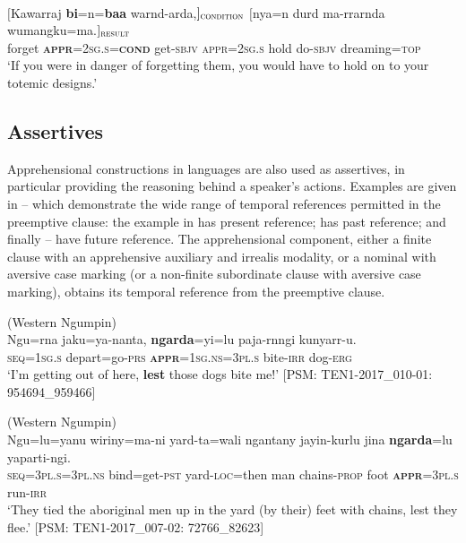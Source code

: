 \documentclass[output=paper,colorlinks,citecolor=brown]{langscibook}
\begin{document}
\ea 
{} \\
\gll $[$Kawarraj \textbf{bi}=n=\textbf{baa} {warnd-arda,$]{_\textnormal{\textsc{condition}}}$ \hspace*{2cm}} $[$nya=n durd ma-rrarnda wumangku=ma.$]{_\textnormal{\textsc{result}}}$ \\
forget \textsc{\textbf{appr}=2sg.s=\textbf{cond}} get-\textsc{sbjv} \textsc{appr=2sg.s} hold do-\textsc{sbjv} dreaming=\textsc{top} \\
\glt `If you were in danger of forgetting them, you would have to hold on to your totemic designs.'
\label{ex:bro81}
\z

\subsection{Assertives}
\label{subsec:assertives}
\largerpage

Apprehensional constructions in  languages are also used as assertives, in particular providing the reasoning behind a speaker’s actions. Examples are given in -- which demonstrate the wide range of temporal references permitted in the preemptive clause: the example in  has present reference;  has past reference; and finally -- have future reference. The apprehensional component, either a finite clause with an apprehensive auxiliary and irrealis modality, or a nominal with aversive case marking (or a non-finite subordinate clause with aversive case marking), obtains its temporal reference from the preemptive clause.

\ea
\textnormal{ (Western Ngumpin)} \\
\gll Ngu=rna jaku=ya-nanta, \textbf{ngarda}=yi=lu paja-rnngi kunyarr-u. \\
\textsc{seq=1sg.s} depart=go\textsc{-prs} \textsc{\textbf{appr}=1sg.ns=3pl.s} bite-\textsc{irr} dog-\textsc{erg} \\
\glt `I'm getting out of here, \textbf{lest} those dogs bite me!' [PSM: TEN1-2017\_010-01: 954694\_959466]
\label{ex:bro82}
\z

\ea 
\textnormal{ (Western Ngumpin)} \\
\gll Ngu=lu=yanu wiriny=ma-ni yard-ta=wali ngantany jayin-kurlu jina \textbf{ngarda}=lu yaparti-ngi. \\
\textsc{seq=3pl.s=3pl.ns} bind=get-\textsc{pst} yard-\textsc{loc}=then man chains-\textsc{prop} foot \textsc{\textbf{appr}=3pl.s} run-\textsc{irr} \\
\glt `They tied the aboriginal men up in the yard (by their) feet with chains, lest they flee.' [PSM: TEN1-2017\_007-02: 72766\_82623]
\label{ex:bro83}
\z
\end{document}

